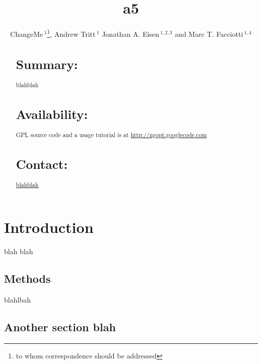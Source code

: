 \documentclass{bioinfo}
\begin{document}

\title[a5]{a5}
\author[ChangeMe \textit{et~al}]{ChangeMe\,$^{1}$\footnote{to whom correspondence should be addressed}, Andrew Tritt\,$^{1}$ Jonathan A. Eisen\,$^{1,2,3}$ and Marc T. Facciotti\,$^{1,4}$}
\address{$^{1}$Genome Center, $^{2}$ Dept. of Evolution and Ecology, $^{3}$ Medical Microbiology and Immunology, 
$^{4}$ Biomedical Engineering, University of California-Davis, Davis, CA 95616.}



\maketitle

\begin{abstract}

\section{Summary:}
blahblah
\section{Availability:}
GPL source code and a usage tutorial is at \href{http://ngopt.googlecode.com}{http://ngopt.googlecode.com}

\section{Contact:} \href{blahblah}{blahblah}
\end{abstract}

\section{Introduction}
blah blah

\begin{methods}
\section{Methods}
blahlbah

\end{methods}

\subsection{Another section blah}
\end{document}
